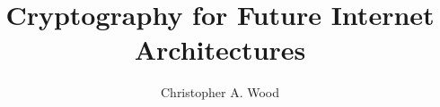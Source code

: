 \documentclass[]{llncs} %
\begin{document}
\title{Cryptography for Future Internet Architectures}
\author{Christopher A. Wood}

\maketitle

\begin{abstract}
\end{abstract}






\end{document}
